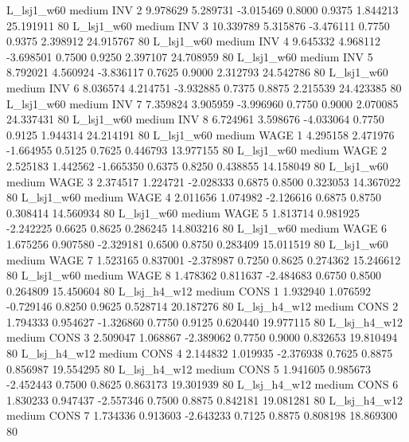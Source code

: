     L_lsj1_w60     medium      INV                 2  9.978629 5.289731 -3.015469 0.8000 0.9375  1.844213   25.191911 80
    L_lsj1_w60     medium      INV                 3 10.339789 5.315876 -3.476111 0.7750 0.9375  2.398912   24.915767 80
    L_lsj1_w60     medium      INV                 4  9.645332 4.968112 -3.698501 0.7500 0.9250  2.397107   24.708959 80
    L_lsj1_w60     medium      INV                 5  8.792021 4.560924 -3.836117 0.7625 0.9000  2.312793   24.542786 80
    L_lsj1_w60     medium      INV                 6  8.036574 4.214751 -3.932885 0.7375 0.8875  2.215539   24.423385 80
    L_lsj1_w60     medium      INV                 7  7.359824 3.905959 -3.996960 0.7750 0.9000  2.070085   24.337431 80
    L_lsj1_w60     medium      INV                 8  6.724961 3.598676 -4.033064 0.7750 0.9125  1.944314   24.214191 80
    L_lsj1_w60     medium     WAGE                 1  4.295158 2.471976 -1.664955 0.5125 0.7625  0.446793   13.977155 80
    L_lsj1_w60     medium     WAGE                 2  2.525183 1.442562 -1.665350 0.6375 0.8250  0.438855   14.158049 80
    L_lsj1_w60     medium     WAGE                 3  2.374517 1.224721 -2.028333 0.6875 0.8500  0.323053   14.367022 80
    L_lsj1_w60     medium     WAGE                 4  2.011656 1.074982 -2.126616 0.6875 0.8750  0.308414   14.560934 80
    L_lsj1_w60     medium     WAGE                 5  1.813714 0.981925 -2.242225 0.6625 0.8625  0.286245   14.803216 80
    L_lsj1_w60     medium     WAGE                 6  1.675256 0.907580 -2.329181 0.6500 0.8750  0.283409   15.011519 80
    L_lsj1_w60     medium     WAGE                 7  1.523165 0.837001 -2.378987 0.7250 0.8625  0.274362   15.246612 80
    L_lsj1_w60     medium     WAGE                 8  1.478362 0.811637 -2.484683 0.6750 0.8500  0.264809   15.450604 80
  L_lsj_h4_w12     medium     CONS                 1  1.932940 1.076592 -0.729146 0.8250 0.9625  0.528714   20.187276 80
  L_lsj_h4_w12     medium     CONS                 2  1.794333 0.954627 -1.326860 0.7750 0.9125  0.620440   19.977115 80
  L_lsj_h4_w12     medium     CONS                 3  2.509047 1.068867 -2.389062 0.7750 0.9000  0.832653   19.810494 80
  L_lsj_h4_w12     medium     CONS                 4  2.144832 1.019935 -2.376938 0.7625 0.8875  0.856987   19.554295 80
  L_lsj_h4_w12     medium     CONS                 5  1.941605 0.985673 -2.452443 0.7500 0.8625  0.863173   19.301939 80
  L_lsj_h4_w12     medium     CONS                 6  1.830233 0.947437 -2.557346 0.7500 0.8875  0.842181   19.081281 80
  L_lsj_h4_w12     medium     CONS                 7  1.734336 0.913603 -2.643233 0.7125 0.8875  0.808198   18.869300 80
